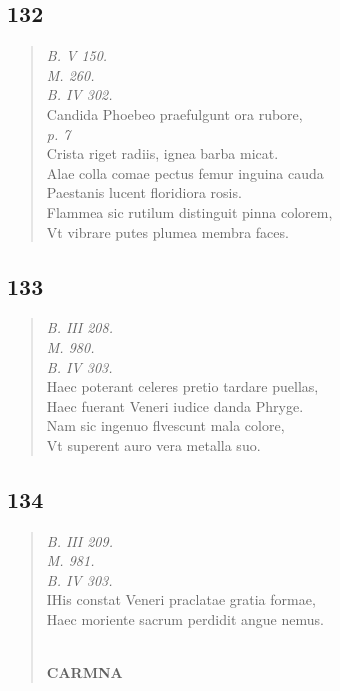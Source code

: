 \documentclass[11pt, a4paper]{report}
\begin{document}
            \subsection*{132}
      \begin{verse}
      \textit{B. V 150.} \\ \textit{M. 260.} \\ \textit{B. IV 302.} \\ Candida Phoebeo praefulgunt ora rubore, \\ \textit{p. 7} \\ Crista riget radiis, ignea barba micat. \\ Alae colla comae pectus femur inguina cauda \\ Paestanis lucent floridiora rosis. \\ Flammea sic rutilum distinguit pinna colorem, \\ Vt vibrare putes plumea membra faces. \\ 
      \end{verse}
  
            \subsection*{133}
      \begin{verse}
      \textit{B. III 208.} \\ \textit{M. 980.} \\ \textit{B. IV 303.} \\ Haec poterant celeres pretio tardare puellas, \\ Haec fuerant Veneri iudice danda Phryge. \\ Nam sic ingenuo flvescunt mala colore, \\ Vt superent auro vera metalla suo. \\ 
      \end{verse}
  
            \subsection*{134}
      \begin{verse}
      \textit{B. III 209.} \\ \textit{M. 981.} \\ \textit{B. IV 303.} \\ IHis constat Veneri praclatae gratia formae, \\ Haec moriente sacrum perdidit angue nemus. \\ 
        ﻿\pagebreak 
    \begin{center} \textbf{CARMNA} \end{center} \marginpar{[140]} 
      \end{verse}
  
\end{document}

